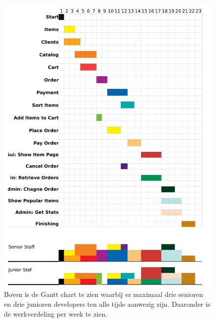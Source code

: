 \documentclass[•]{article}
\begin{document}
\begin{figure}
\centering
\includegraphics[width=13.5cm]{maxStaffPlanning.jpg}
\caption{Boven is de Gantt chart te zien waarbij er maximaal drie senioren en drie junioren developers ten alle tijde aanwezig zijn. Daaronder is de werkverdeling per week te zien.}
\label{maxGantt}
\end{figure}

\newpage
\end{document}
